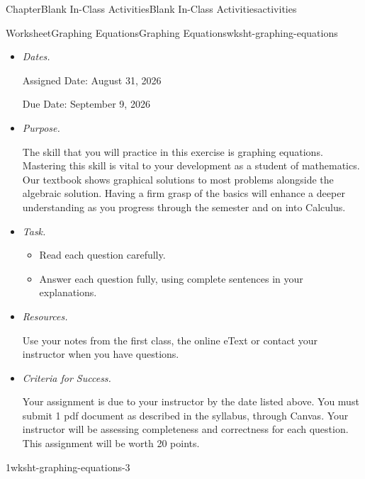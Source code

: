 \documentclass[twoside,14pt,]{extbook}
\newcommand{\ptxlistdisc}{\raisebox{0.3ex}{\textbullet}}
\newcommand{\ptxlistcircle}{\raisebox{0.3ex}{\textopenbullet}}
\newcommand{\ptxlititle}[1]{{\slshape#1}}
\begin{document}
\begin{chapterptx}{Chapter}{Blank In-Class Activities}{}{Blank In-Class Activities}{}{}{activities}
\renewcommand*{\chaptername}{Chapter}
%
%
\typeout{************************************************}
\typeout{************************************************}
%
\begin{worksheet-section}{Worksheet}{Graphing Equations}{}{Graphing Equations}{}{}{wksht-graphing-equations}
\begin{introduction}{}%
%
\begin{itemize}[label=\ptxlistdisc]
\item{}\ptxlititle{Dates.}\par%
Assigned Date: August 31, 2026%
\par
Due Date: September 9, 2026%
\item{}\ptxlititle{Purpose.}\par%
The skill that you will practice in this exercise is graphing equations. Mastering this skill is vital to your development as a student of mathematics. Our textbook shows graphical solutions to most problems alongside the algebraic solution. Having a firm grasp of the basics will enhance a deeper understanding as you progress through the semester and on into Calculus.%
\item{}\ptxlititle{Task.}\par%
%
\begin{itemize}[label=\ptxlistcircle]
\item{}Read each question carefully.%
\item{}Answer each question fully, using complete sentences in your explanations.%
\end{itemize}
%
\item{}\ptxlititle{Resources.}\par%
Use your notes from the first class, the online eText or contact your instructor when you have questions.%
\item{}\ptxlititle{Criteria for Success.}\par%
Your assignment is due to your instructor by the date listed above. You must submit 1 pdf document as described in the syllabus, through Canvas. Your instructor will be assessing completeness and correctness for each question. This assignment will be worth 20 points.%
\end{itemize}
%
\end{introduction}%
\begin{divisionexercise}{1}{}{}{wksht-graphing-equations-3}%

\end{divisionexercise}
\end{worksheet-section}
\end{chapterptx}
\end{document}
